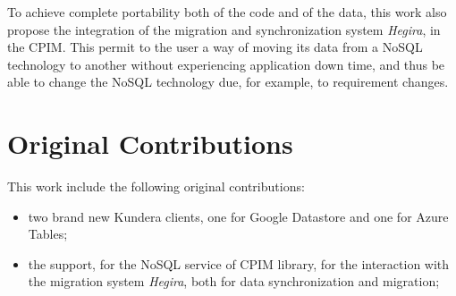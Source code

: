 \noindent To achieve complete portability both of the code and of the data, this work also propose the integration of the migration and synchronization system \textit{Hegira}, in the CPIM. This permit to the user a way of moving its data from a NoSQL technology to another without experiencing application down time, and thus be able to change the NoSQL technology due, for example, to requirement changes.
 
\section*{Original Contributions}
This work include the following original contributions:
\begin{itemize}
\item two brand new Kundera clients, one for Google Datastore and one for Azure Tables;
\item the support, for the  NoSQL service of CPIM library, for the interaction with the migration system \textit{Hegira}, both for data synchronization and migration; 
\end{itemize}

